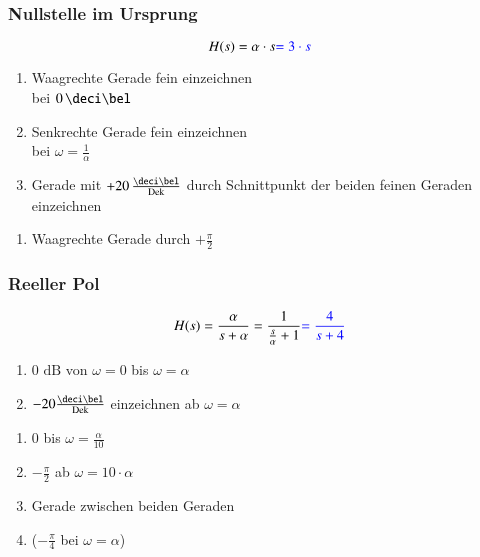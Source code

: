 \subsubsection{Nullstelle im Ursprung}

\begin{minipage}[t]{0.48\columnwidth}
    $$ H(s) = \alpha \cdot s {\color{blue}= 3\cdot s} $$
    
\end{minipage}
\hfill
\begin{minipage}[t]{0.48\columnwidth}

    \begin{enumerate}
        \item Waagrechte Gerade fein einzeichnen\\bei $0 \, \deci \bel$
        \item Senkrechte Gerade fein einzeichnen\\bei $\omega = \frac{1}{\alpha}$
        \item Gerade mit $+20 \, \frac{\deci \bel}{\Dek}$ durch Schnittpunkt der beiden feinen Geraden einzeichnen
    \end{enumerate}
    

    \begin{enumerate}
        \item Waagrechte Gerade durch $+\frac{\pi}{2}$
    \end{enumerate}
\end{minipage}


\subsubsection{Reeller Pol}

\begin{minipage}[t]{0.48\columnwidth}
    $$ H(s) = \frac{\alpha}{s + \alpha} = \frac{1}{\frac{s}{\alpha} + 1} {\color{blue}= \frac{4}{s + 4}} $$
    
\end{minipage}
\hfill
\begin{minipage}[t]{0.48\columnwidth}

    \begin{enumerate}
        \item 0 $\text{dB}$ von $\omega=0$ bis $\omega=\alpha$
        \item $-20\frac{\deci \bel}{\Dek}$ einzeichnen ab $\omega = \alpha$
    \end{enumerate}


    \begin{enumerate}
        \item $0$ bis $\omega = \frac{\alpha}{10}$
        \item $-\frac{\pi}{2}$ ab $\omega = 10\cdot \alpha$
        \item Gerade zwischen beiden Geraden 
        \item ($-\frac{\pi}{4}$ bei $\omega=\alpha$)
    \end{enumerate}

\end{minipage}


